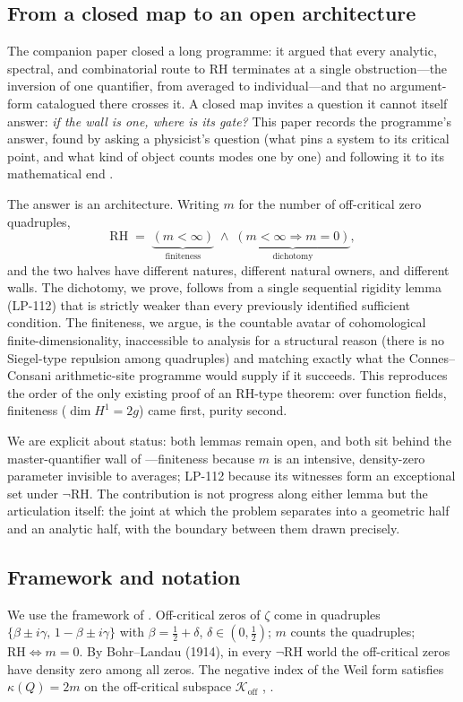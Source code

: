 \documentclass[11pt]{amsart}
\theoremstyle{definition}
\theoremstyle{remark}
\newcommand{\RH}{\mathrm{RH}}
\newcommand{\Koff}{\mathcal{K}_{\mathrm{off}}}
\begin{document}
\subsection{From a closed map to an open architecture}
The companion paper \cite{P43} closed a long programme: it argued that
every analytic, spectral, and combinatorial route to RH terminates at a
single obstruction---the inversion of one quantifier, from averaged to
individual---and that no argument-form catalogued there crosses it. A
closed map invites a question it cannot itself answer: \emph{if the wall
is one, where is its gate?} This paper records the programme's answer,
found by asking a physicist's question (what pins a system to its critical
point, and what kind of object counts modes one by one) and following it
to its mathematical end \cite[Docs~109--113]{P40}.

The answer is an architecture. Writing $m$ for the number of off-critical
zero quadruples,
\[
\RH \;=\; \underbrace{(m<\infty)}_{\text{finiteness}}
\;\wedge\;
\underbrace{(m<\infty\Rightarrow m=0)}_{\text{dichotomy}},
\]
and the two halves have different natures, different natural owners, and
different walls. The dichotomy, we prove, follows from a single sequential
rigidity lemma (LP-112) that is strictly weaker than every previously
identified sufficient condition. The finiteness, we argue, is the countable
avatar of cohomological finite-dimensionality, inaccessible to analysis for
a structural reason (there is no Siegel-type repulsion among quadruples)
and matching exactly what the Connes--Consani arithmetic-site programme
would supply if it succeeds. This reproduces the order of the only existing
proof of an RH-type theorem: over function fields, finiteness
($\dim H^1=2g$) came first, purity second.

We are explicit about status: both lemmas remain open, and both sit behind
the master-quantifier wall of \cite{P43}---finiteness because $m$ is an
intensive, density-zero parameter invisible to averages; LP-112 because its
witnesses form an exceptional set under $\neg\RH$. The contribution is not
progress along either lemma but the articulation itself: the joint at which
the problem separates into a geometric half and an analytic half, with the
boundary between them drawn precisely.

\subsection{Framework and notation}
We use the framework of \cite{P39,P40,P41,P42,P43}. Off-critical zeros of
$\zeta$ come in quadruples $\{\beta\pm i\gamma,\,1-\beta\pm i\gamma\}$ with
$\beta=\tfrac12+\delta$, $\delta\in(0,\tfrac12)$; $m$ counts the quadruples;
$\RH\iff m=0$. By Bohr--Landau (1914), in every $\neg\RH$ world the
off-critical zeros have density zero among all zeros. The negative index of
the Weil form satisfies $\kappa(Q)=2m$ on the off-critical subspace $\Koff$
\cite{P35}, \cite[]{P40}.
\end{document}

